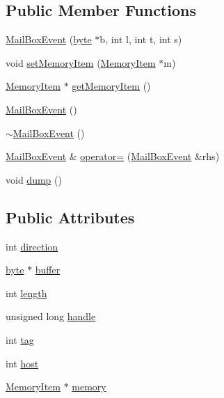 \subsection*{Public Member Functions}
\begin{DoxyCompactItemize}
\item 
\hyperlink{struct_mail_box_event_a187ea286cc518a6840118ef2298fd62c}{MailBoxEvent} (\hyperlink{engine_8hpp_a0c8186d9b9b7880309c27230bbb5e69d}{byte} $\ast$b, int l, int t, int s)
\item 
void \hyperlink{struct_mail_box_event_abb0f7e669caa868825f47ab2798ca1ca}{setMemoryItem} (\hyperlink{struct_memory_item}{MemoryItem} $\ast$m)
\item 
\hyperlink{struct_memory_item}{MemoryItem} $\ast$ \hyperlink{struct_mail_box_event_a1b6dc78ff4c77136d16ff11871a2a2d8}{getMemoryItem} ()
\item 
\hyperlink{struct_mail_box_event_abb298cbe0ee701d863fed2d0a9f59641}{MailBoxEvent} ()
\item 
\hyperlink{struct_mail_box_event_a15b0b506d91c8961389a9e922522da04}{$\sim$MailBoxEvent} ()
\item 
\hyperlink{struct_mail_box_event}{MailBoxEvent} \& \hyperlink{struct_mail_box_event_a3515dd1068f31081552c20ead7fbcdb2}{operator=} (\hyperlink{struct_mail_box_event}{MailBoxEvent} \&rhs)
\item 
void \hyperlink{struct_mail_box_event_a7ddaceefa5b710b8c28bf185c91b8b5e}{dump} ()
\end{DoxyCompactItemize}
\subsection*{Public Attributes}
\begin{DoxyCompactItemize}
\item 
int \hyperlink{struct_mail_box_event_a751424d60431ff9008322bfe1f981008}{direction}
\item 
\hyperlink{engine_8hpp_a0c8186d9b9b7880309c27230bbb5e69d}{byte} $\ast$ \hyperlink{struct_mail_box_event_af985444da7a2549b64fe4bacc1a68ab1}{buffer}
\item 
int \hyperlink{struct_mail_box_event_a70601308260beb76601c24e5cf49c866}{length}
\item 
unsigned long \hyperlink{struct_mail_box_event_a514bc3bba3344150482f1d9242ab4a69}{handle}
\item 
int \hyperlink{struct_mail_box_event_a2f5ed3c05ac0ca2ef5fc4ec7e3128390}{tag}
\item 
int \hyperlink{struct_mail_box_event_aa36d737e6dcc60e6c6ffc7741ec65331}{host}
\item 
\hyperlink{struct_memory_item}{MemoryItem} $\ast$ \hyperlink{struct_mail_box_event_a7c43c5a6b7311a0d9a69964d28a07eb2}{memory}
\end{DoxyCompactItemize}


